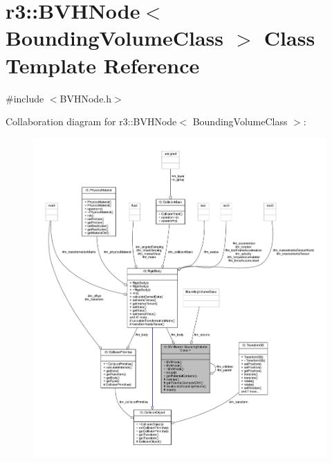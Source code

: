 \hypertarget{classr3_1_1_b_v_h_node}{}\section{r3\+:\+:B\+V\+H\+Node$<$ Bounding\+Volume\+Class $>$ Class Template Reference}
\label{classr3_1_1_b_v_h_node}


{\ttfamily \#include $<$B\+V\+H\+Node.\+h$>$}



Collaboration diagram for r3\+:\+:B\+V\+H\+Node$<$ Bounding\+Volume\+Class $>$\+:\nopagebreak
\begin{figure}[H]
\begin{center}
\leavevmode
\includegraphics[width=350pt]{classr3_1_1_b_v_h_node__coll__graph}
\end{center}
\end{figure}
